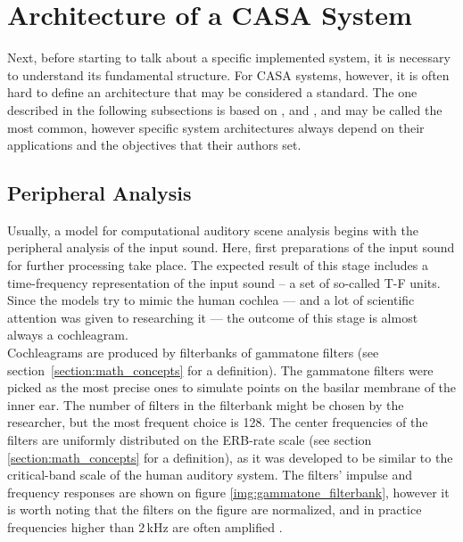 \section{Architecture of a CASA System}\label{section:casa_architecture}

Next, before starting to talk about a specific implemented system, it is necessary to understand its fundamental structure. For CASA systems, however, it is often hard to define an architecture that may be considered a standard. The one described in the following subsections is based on \cite{Wang2006}, \cite{Wang2012} and \cite{Jasti2020}, and may be called the most common, however specific system architectures always depend on their applications and the objectives that their authors set.

\subsection{Peripheral Analysis}\label{subsection:casa_peripheral_analysis}

Usually, a model for computational auditory scene analysis begins with the peripheral analysis of the input sound. Here, first preparations of the input sound for further processing take place. The expected result of this stage includes a time-frequency representation of the input sound -- a set of so-called T-F units. Since the models try to mimic the human cochlea --- and a lot of scientific attention was given to researching it --- the outcome of this stage is almost always a cochleagram.\\

Cochleagrams are produced by filterbanks of gammatone filters (see section~\ref{section:math_concepts} for a definition). The gammatone filters were picked as the most precise ones to simulate points on the basilar membrane of the inner ear. The number of filters in the filterbank might be chosen by the researcher, but the most frequent choice is 128. The center frequencies of the filters are uniformly distributed on the ERB-rate scale (see section \ref{section:math_concepts} for a definition), as it was developed to be similar to the critical-band scale of the human auditory system. The filters' impulse and frequency responses are shown on figure \ref{img:gammatone_filterbank}, however it is worth noting that the filters on the figure are normalized, and in practice frequencies higher than 2\,kHz are often amplified \cite{Wang2006}.\\

